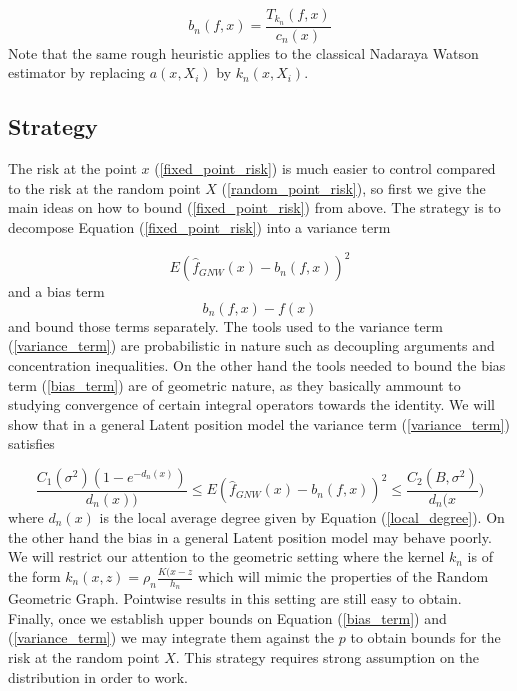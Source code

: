 \documentclass{article}
\begin{document}
\begin{equation}
    b_n(f,x)=\frac{T_{k_n}(f,x)}{c_n(x)}
\end{equation}
Note that the same rough heuristic applies to the classical Nadaraya Watson estimator by replacing $a(x,X_i)$ by $k_n(x,X_i)$.

\subsection{Strategy}

The risk at the point $x$ (\ref{fixed_point_risk}) is much easier to control compared to the risk at the random point $X$ (\ref{random_point_risk}), so first we give the main ideas on how to bound (\ref{fixed_point_risk}) from above. The strategy is to decompose Equation (\ref{fixed_point_risk}) into a variance term

\begin{equation}
\label{variance_term}
E(\hat{f}_{GNW}(x)-b_n(f,x))^2
\end{equation}
and a bias term
\begin{equation}
\label{bias_term}
b_n(f,x)-f(x)
\end{equation}
and bound those terms separately. The tools used to the variance term (\ref{variance_term}) are probabilistic in nature such as decoupling arguments and concentration inequalities. On the other hand the tools needed  to bound the bias term (\ref{bias_term}) are of geometric nature, as they basically ammount to studying convergence of certain integral operators towards the identity. We will show that in a general Latent position model the variance term (\ref{variance_term}) satisfies

\begin{equation*}
    \frac{C_1(\sigma^2)(1-e^{-d_n(x)})}{d_n(x))}\leq E(\hat{f}_{GNW}(x)-b_n(f,x))^2\leq \frac{C_2(B,\sigma^2)}{d_n(x})
\end{equation*}
where $d_n(x)$ is the local average degree given by Equation (\ref{local_degree}). On the other hand the bias in a general Latent position model may behave poorly. We will restrict our attention to the geometric setting where the kernel $k_n$ is of the form $k_n(x,z)=\rho_n\frac{K(x-z}{h_n}$ which will mimic the properties of the Random Geometric Graph. Pointwise results in this setting are still easy to obtain. Finally, once we establish upper bounds on Equation (\ref{bias_term}) and (\ref{variance_term}) we may integrate them against the $p$ to obtain bounds for the risk at the random point $X$. This strategy requires strong assumption on the distribution in order to work.  
\end{document}
